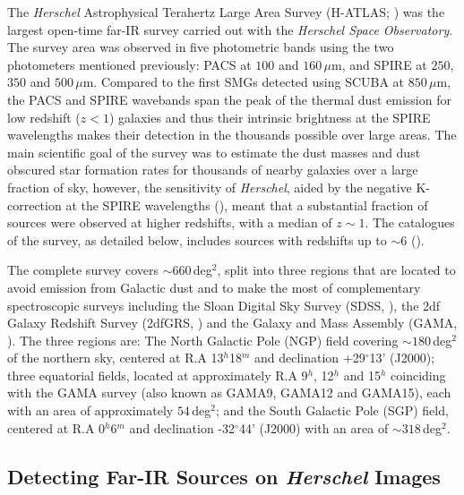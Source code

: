 The \textit{Herschel} Astrophysical Terahertz Large Area Survey (H-ATLAS; \citealt{Eales_2010}) was the largest open-time far-IR survey carried out with the \textit{Herschel Space Observatory}. The survey area was observed in five photometric bands using the two photometers mentioned previously: PACS at $100$ and $160\,\mu$m, and SPIRE at $250$, $350$ and $500\,\mu$m. Compared to the first SMGs detected using SCUBA at $850\,\mu$m, the PACS and SPIRE wavebands span the peak of the thermal dust emission for low redshift ($z < 1$) galaxies and thus their intrinsic brightness at the SPIRE wavelengths makes their detection in the thousands possible over large areas. The main scientific goal of the survey was to estimate the dust masses and dust obscured star formation rates for thousands of nearby galaxies over a large fraction of sky, however, the sensitivity of \textit{Herschel}, aided by the negative K-correction at the SPIRE wavelengths (\citealt{Blain_1993}), meant that a substantial fraction of sources were observed at higher redshifts, with a median of $z \sim 1$. The catalogues of the survey, as detailed below, includes sources with redshifts up to $\sim 6$ (\citealt{Amblard_2010, Lapi_2011, Fudamoto_2017, Zavala_2018}).

The complete survey covers $\sim 660\,$deg$^2$, split into three regions that are located to avoid emission from Galactic dust and to make the most of complementary spectroscopic surveys including the Sloan Digital Sky Survey (SDSS, \citealt{York_2000}), the 2df Galaxy Redshift Survey (2dfGRS, \citealt{Colless_2001}) and the Galaxy and Mass Assembly (GAMA, \citealt{Driver_2009}). The three regions are: The North Galactic Pole (NGP) field covering $\sim 180\,$deg$^2$ of the northern sky, centered at R.A 13$^{h}$18$^{m}$ and declination +29$^{\circ}$13' (J2000); three equatorial fields, located at approximately R.A 9$^{h}$, 12$^{h}$ and 15$^{h}$ coinciding with the GAMA survey (also known as GAMA9, GAMA12 and GAMA15), each with an area of approximately $54\,$deg$^2$; and the South Galactic Pole (SGP) field, centered at R.A 0$^{h}$6$^{m}$ and declination -32$^{\circ}$44' (J2000) with an area of $\sim 318\,$deg$^2$. 

\subsection{Detecting Far-IR Sources on \textit{Herschel} Images}
\label{sec:Detecting Submillimeter Sources on Herschel Images}

